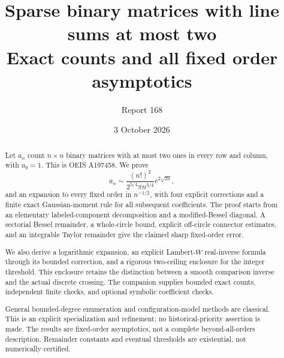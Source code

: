 \documentclass[11pt,letterpaper]{article}
\title{Sparse binary matrices with line sums at most two\\\large Exact counts and all fixed order asymptotics}
\author{Report 168}
\date{3 October 2026}
\numberwithin{equation}{section}
\theoremstyle{remark}\newtheorem{remark}[theorem]{Remark}
\begin{document}
\maketitle
\begin{abstract}
Let $a_n$ count $n\times n$ binary matrices with at most two ones in
every row and column, with $a_0=1$. This is OEIS A197458. We prove
\[
 a_n\sim \frac{(n!)^2}{2^{5/4}\pi n^{3/4}}e^{2\sqrt{2n}},
\]
and an expansion to every fixed order in $n^{-1/2}$, with four explicit
corrections and a finite exact Gaussian-moment rule for all subsequent
coefficients. The proof starts from an elementary labeled-component
decomposition and a modified-Bessel diagonal. A sectorial Bessel
remainder, a whole-circle bound, explicit off-circle connector
estimates, and an integrable Taylor remainder give the claimed sharp
fixed-order error.

We also derive a logarithmic expansion, an explicit Lambert-$W$
real-inverse formula through its bounded correction, and a rigorous
two-ceiling enclosure for the integer threshold. This enclosure
retains the distinction between a smooth comparison inverse and the
actual discrete crossing. The companion supplies bounded exact counts,
independent finite checks, and optional symbolic coefficient checks.

General bounded-degree enumeration and configuration-model methods are
classical. This is an explicit specialization and refinement; no
historical-priority assertion is made. The results are fixed-order
asymptotics, not a complete beyond-all-orders description. Remainder
constants and eventual thresholds are existential, not numerically
certified.
\end{abstract}
\end{document}
